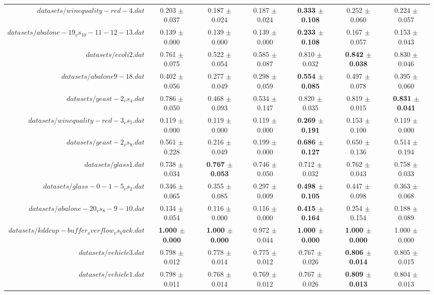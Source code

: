\begin{table}[!ht]
{\begin{tabular}{r c c c c c c}
$datasets/winequality-red-4.dat$ & 0.203 $\pm$ 0.037 & 0.187 $\pm$ 0.024 & 0.187 $\pm$ 0.024 & \textbf{0.333 $\pm$ 0.108} & 0.252 $\pm$ 0.060 & 0.224 $\pm$ 0.057 \\
$datasets/abalone-19_vs_10-11-12-13.dat$ & 0.139 $\pm$ 0.000 & 0.139 $\pm$ 0.000 & 0.139 $\pm$ 0.000 & \textbf{0.233 $\pm$ 0.108} & 0.167 $\pm$ 0.057 & 0.153 $\pm$ 0.043 \\
$datasets/ecoli2.dat$ & 0.761 $\pm$ 0.075 & 0.522 $\pm$ 0.054 & 0.585 $\pm$ 0.087 & 0.810 $\pm$ 0.032 & \textbf{0.842 $\pm$ 0.038} & 0.830 $\pm$ 0.046 \\
$datasets/abalone9-18.dat$ & 0.402 $\pm$ 0.056 & 0.277 $\pm$ 0.049 & 0.298 $\pm$ 0.059 & \textbf{0.554 $\pm$ 0.085} & 0.497 $\pm$ 0.078 & 0.395 $\pm$ 0.060 \\
$datasets/yeast-2_vs_4.dat$ & 0.786 $\pm$ 0.050 & 0.468 $\pm$ 0.093 & 0.534 $\pm$ 0.147 & 0.820 $\pm$ 0.035 & 0.819 $\pm$ 0.015 & \textbf{0.831 $\pm$ 0.041} \\
$datasets/winequality-red-3_vs_5.dat$ & 0.119 $\pm$ 0.000 & 0.119 $\pm$ 0.000 & 0.119 $\pm$ 0.000 & \textbf{0.269 $\pm$ 0.191} & 0.153 $\pm$ 0.100 & 0.119 $\pm$ 0.000 \\
$datasets/yeast-2_vs_8.dat$ & 0.561 $\pm$ 0.228 & 0.216 $\pm$ 0.049 & 0.199 $\pm$ 0.000 & \textbf{0.686 $\pm$ 0.127} & 0.650 $\pm$ 0.136 & 0.514 $\pm$ 0.194 \\
$datasets/glass1.dat$ & 0.738 $\pm$ 0.034 & \textbf{0.767 $\pm$ 0.053} & 0.746 $\pm$ 0.050 & 0.712 $\pm$ 0.032 & 0.762 $\pm$ 0.043 & 0.758 $\pm$ 0.033 \\
$datasets/glass-0-1-5_vs_2.dat$ & 0.346 $\pm$ 0.065 & 0.355 $\pm$ 0.085 & 0.297 $\pm$ 0.009 & \textbf{0.498 $\pm$ 0.105} & 0.447 $\pm$ 0.098 & 0.363 $\pm$ 0.068 \\
$datasets/abalone-20_vs_8-9-10.dat$ & 0.134 $\pm$ 0.054 & 0.116 $\pm$ 0.000 & 0.116 $\pm$ 0.000 & \textbf{0.415 $\pm$ 0.164} & 0.254 $\pm$ 0.154 & 0.188 $\pm$ 0.089 \\
$datasets/kddcup-buffer_overflow_vs_back.dat$ & \textbf{1.000 $\pm$ 0.000} & \textbf{1.000 $\pm$ 0.000} & 0.972 $\pm$ 0.044 & \textbf{1.000 $\pm$ 0.000} & \textbf{1.000 $\pm$ 0.000} & 1.000 $\pm$ 0.000 \\
$datasets/vehicle3.dat$ & 0.798 $\pm$ 0.012 & 0.778 $\pm$ 0.014 & 0.775 $\pm$ 0.012 & 0.767 $\pm$ 0.026 & \textbf{0.806 $\pm$ 0.014} & 0.805 $\pm$ 0.015 \\
$datasets/vehicle1.dat$ & 0.798 $\pm$ 0.011 & 0.768 $\pm$ 0.014 & 0.769 $\pm$ 0.012 & 0.767 $\pm$ 0.026 & \textbf{0.809 $\pm$ 0.013} & 0.804 $\pm$ 0.013 \\

\end{tabular}}
\end{table}
